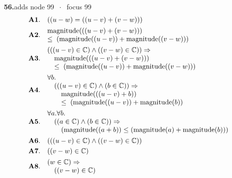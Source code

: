 \documentclass[11pt]{article}
\theoremstyle{plain}
\newcommand{\fit}[1]{\resizebox{\ifdim\width>\linewidth\linewidth\else\width\fi}{!}{#1}}
\begin{document}
\medskip\noindent\textbf{56.}\quad \fit{\texttt{(subst '(= (- u w) (+ (- u v) (- v w))))}}\hfill{\small adds node 99 $\;\cdot\;$ focus 99}\\[2pt]
\begin{align*}
  \mathbf{A1.}\quad & ((u - w) = ((u - v) + (v - w))) \\
  \mathbf{A2.}\quad & \begin{array}{@{}l@{}} \operatorname{magnitude}(((u - v) + (v - w))) \\ \leq\; (\operatorname{magnitude}((u - v)) + \operatorname{magnitude}((v - w))) \end{array} \\
  \mathbf{A3.}\quad & \begin{array}{@{}l@{}} (((u - v) \in \mathbb{C}) \wedge ((v - w) \in \mathbb{C})) \Rightarrow  \\ \quad \operatorname{magnitude}(((u - v) + (v - w))) \\ \quad \leq\; (\operatorname{magnitude}((u - v)) + \operatorname{magnitude}((v - w))) \end{array} \\
  \mathbf{A4.}\quad & \begin{array}{@{}l@{}} \forall b. \\ \quad (((u - v) \in \mathbb{C}) \wedge (b \in \mathbb{C})) \Rightarrow  \\ \quad \quad \operatorname{magnitude}(((u - v) + b)) \\ \quad \quad \leq\; (\operatorname{magnitude}((u - v)) + \operatorname{magnitude}(b)) \end{array} \\
  \mathbf{A5.}\quad & \begin{array}{@{}l@{}} \forall a. \forall b. \\ \quad ((a \in \mathbb{C}) \wedge (b \in \mathbb{C})) \Rightarrow  \\ \quad \quad (\operatorname{magnitude}((a + b)) \leq (\operatorname{magnitude}(a) + \operatorname{magnitude}(b))) \end{array} \\
  \mathbf{A6.}\quad & (((u - v) \in \mathbb{C}) \wedge ((v - w) \in \mathbb{C})) \\
  \mathbf{A7.}\quad & ((v - w) \in \mathbb{C}) \\
  \mathbf{A8.}\quad & \begin{array}{@{}l@{}} (w \in \mathbb{C}) \Rightarrow  \\ \quad ((v - w) \in \mathbb{C}) \end{array} \\

\end{align*}
\end{document}
